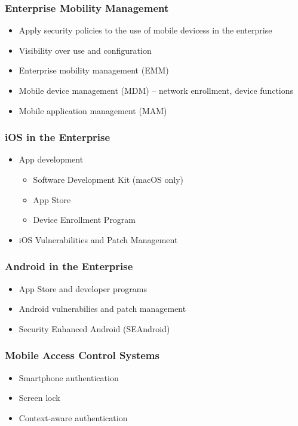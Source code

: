 		\subsubsection {Enterprise Mobility Management}
			\begin{itemize}
				\item Apply security policies to the use of mobile devicess in the
					enterprise
				\item Visibility over use and configuration
				\item Enterprise mobility management (EMM)
				\item Mobile device management (MDM) -- network enrollment,
					device functions
				\item Mobile application management (MAM) 
			\end{itemize}
		\subsubsection {iOS in the Enterprise}
			\begin{itemize}
				\item App development
					\begin{itemize}
						\item Software Development Kit (macOS only)
						\item App Store
						\item Device Enrollment Program
					\end{itemize}
				\item iOS Vulnerabilities and Patch Management
			\end{itemize}
		\subsubsection {Android in the Enterprise}
			\begin{itemize}
				\item App Store and developer programs
				\item Android vulnerabilies and patch management
				\item Security Enhanced Android (SEAndroid)
			\end{itemize}
		\subsubsection {Mobile Access Control Systems}
			\begin{itemize}
				\item Smartphone authentication
				\item Screen lock
				\item Context-aware authentication
			\end{itemize}
